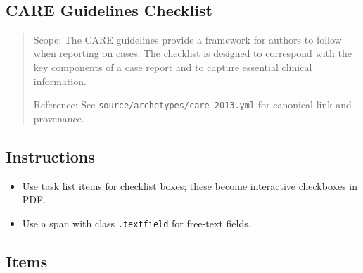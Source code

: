 \documentclass[11pt]{article}
\def\tightlist{}
\begin{document}
\begin{center}
{\LARGE }\\[4pt]
\normalsize 
\end{center}
\vspace{1em}

\begin{Form}

\section{CARE Guidelines Checklist}\label{care-guidelines-checklist}

\begin{quote}
Scope: The CARE guidelines provide a framework for authors to follow
when reporting on cases. The checklist is designed to correspond with
the key components of a case report and to capture essential clinical
information.

Reference: See \texttt{source/archetypes/care-2013.yml} for canonical
link and provenance.
\end{quote}

\subsection{Instructions}\label{instructions}

\begin{itemize}
\tightlist
\item
  Use task list items for checklist boxes; these become interactive
  checkboxes in PDF.
\item
  Use a span with class \texttt{.textfield} for free‑text fields.
\end{itemize}

\subsection{Items}\label{items}


\end{Form}
\end{document}
